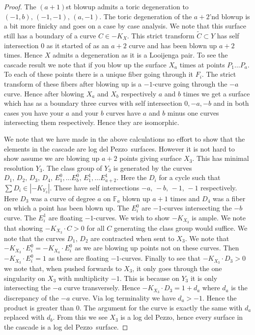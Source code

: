 \documentclass[11pt]{amsbook}
\theoremstyle{plain}
\newcommand{\ldp}{log del Pezzo}
\newcommand{\mb}[1]{\mathbb{#1}}
\newcommand{\LJ}{Looijenga pair}
\newcommand{\wt}[1]{\widetilde #1}
\begin{document}
\begin{proof}
 The $(a+1)$st blowup admits a toric degeneration to $(-1, b), \, (-1, -1), \, (a, -1)$. The toric degeneration of the $a+2$'nd blowup is a bit more finicky and goes on a case by case analysis. We note that this surface still has a boundary of a curve  $C \in -K_X$. This strict transform $\wt{C} \subset Y$ has self intersection $0$ as it started of as an $a+2$ curve and has been blown up $a+2$ times. Hence $X$ admits a degeneration as it is a \LJ. To see the cascade result we note that if you blow up the surface $X_a$ times at points $P_1 \dots P_a$. To each of these points there is a unique fiber going through it $F_i$. The strict transform of these fibers after blowing up is a $-1$-curve going through the $-a$ curve. Hence after blowing $X_a$ and $X_b$ respectively $a$ and $b$ times we get a surface which has as a boundary three curves with self intersection $0, -a, -b$ and in both cases you have your $a$ and your $b$ curves have $a$ and $b$ minus one curves intersecting them respectively. Hence they are isomorphic. 
 
 
 We note that we have made in the above calculations no effort to show that the elements in the cascade are \ldp\ surfaces. However it is not hard to show assume we are blowing up $a+2$ points giving surface $X_3$. This has minimal resolution $Y_3$. The class group of $Y_3$ is generated by the curves $D_1, \, D_2, \, D_3, \, D_4, \, E_1^0, \dots E_b^0, \, E_1^1, \dots E_{a+2}^1$. Here the $D_i$ for a cycle such that $\sum D_i \in |-K_{Y_3}|$. These have self intersections $-a, \, -b, \, -1, \, -1$ respectively. Here $D_3$ was a curve of degree $a$  on $\mb{F}_a$ blown up $a+1$ times and $D_4$ was a fiber on which a point has been blown up. The $E_i^0$ are $-1$-curves intersecting the $-b$ curve. The $E_i^1$ are floating $-1$-curves. We wish to show $-K_{X_3}$ is ample. We note that showing $-K_{X_3} \cdot C > 0$ for all $C$ generating the class group would suffice. We note that the curves $D_1, \, D_2$ are contracted when sent to $X_3$. We note that $-K_{X_3} \cdot E_i^0 = -K_{X_a} \cdot E_i^0$ as we are blowing up points not on these curves. Then $-K_{X_3} \cdot E_i^0 = 1$ as these are floating $-1$-curves. Finally to see that $-K_{X_3} \cdot D_3 > 0$ we note that, when pushed forwards to $X_3$, it only goes through the one singularity on $X_3$ with multiplicity $-1$. This is because on $Y_3$ it is only intersecting the $-a$ curve transversely. Hence $-K_{X_3} \cdot D_3 = 1 + d_a$ where $d_a$ is the discrepancy of the $-a$ curve. Via log terminality we have $d_a > -1$. Hence the product is greater than 0. The argument for the curve is exactly the same with $d_a$ replaced with $d_b$. From this we see $X_3$ is a \ldp, hence every surface in the cascade is a \ldp\ surface.
\end{proof}
\end{document}
